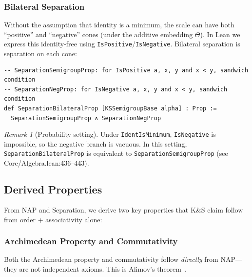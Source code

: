 \documentclass[11pt]{article}
\theoremstyle{definition}
\theoremstyle{remark}
\newtheorem{remark}[theorem]{Remark}
\begin{document}
\subsubsection{Bilateral Separation}

Without the assumption that identity is a minimum, the scale can have both ``positive'' and ``negative''
cones (under the additive embedding $\Theta$). In Lean we express this identity-free using
\texttt{IsPositive}/\texttt{IsNegative}. Bilateral separation is separation on each cone:

\begin{lstlisting}[caption={Bilateral separation (\href{https://github.com/zariuq/ks-foundations-of-inference/blob/main/KnuthSkilling/Core/Algebra.lean\#L415-L426}{Core/Algebra.lean:415--426})},numbers=none]
-- SeparationSemigroupProp: for IsPositive a, x, y and x < y, sandwich condition
-- SeparationNegProp: for IsNegative a, x, y and x < y, sandwich condition
def SeparationBilateralProp [KSSemigroupBase alpha] : Prop :=
  SeparationSemigroupProp ∧ SeparationNegProp
\end{lstlisting}

\begin{remark}[Probability setting]
Under \texttt{IdentIsMinimum}, \texttt{IsNegative} is impossible, so the negative branch is vacuous.
In this setting, \texttt{SeparationBilateralProp} is equivalent to \texttt{SeparationSemigroupProp}
(see Core/Algebra.lean:436--443).
\end{remark}

\subsection{Derived Properties}
\label{subsec:derived}

From NAP and Separation, we derive two key properties that K\&S claim follow from
order + associativity alone:

\subsubsection{Archimedean Property and Commutativity}

Both the Archimedean property and commutativity follow \emph{directly} from NAP---they are not
independent axioms. This is Alimov's theorem~\cite{Alimov1950,Klazar2016}.
\end{document}
